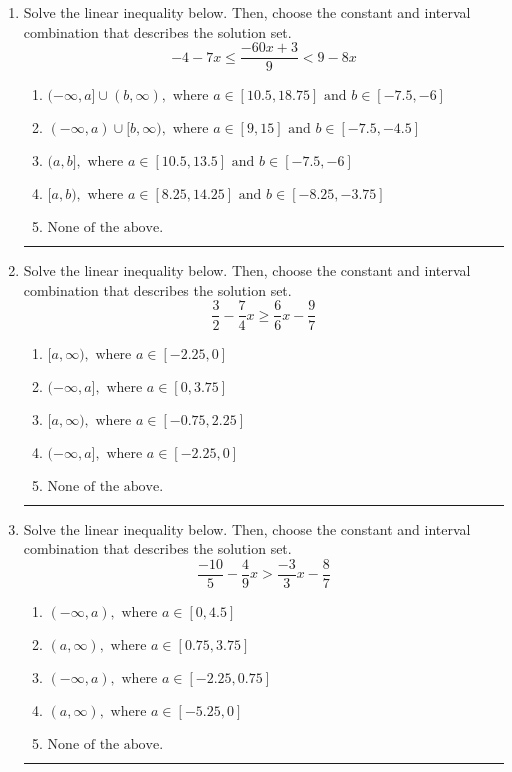 \documentclass[14pt]{extbook}
\newcommand{\litem}[1]{\item#1\hspace*{-1cm}\rule{\textwidth}{0.4pt}}
\begin{document}
\begin{enumerate}
\litem{
Solve the linear inequality below. Then, choose the constant and interval combination that describes the solution set.\[ -4 - 7 x \leq \frac{-60 x + 3}{9} < 9 - 8 x \]\begin{enumerate}[label=\Alph*.]
\item \( (-\infty, a] \cup (b, \infty), \text{ where } a \in [10.5, 18.75] \text{ and } b \in [-7.5, -6] \)
\item \( (-\infty, a) \cup [b, \infty), \text{ where } a \in [9, 15] \text{ and } b \in [-7.5, -4.5] \)
\item \( (a, b], \text{ where } a \in [10.5, 13.5] \text{ and } b \in [-7.5, -6] \)
\item \( [a, b), \text{ where } a \in [8.25, 14.25] \text{ and } b \in [-8.25, -3.75] \)
\item \( \text{None of the above.} \)

\end{enumerate} }
\litem{
Solve the linear inequality below. Then, choose the constant and interval combination that describes the solution set.\[ \frac{3}{2} - \frac{7}{4} x \geq \frac{6}{6} x - \frac{9}{7} \]\begin{enumerate}[label=\Alph*.]
\item \( [a, \infty), \text{ where } a \in [-2.25, 0] \)
\item \( (-\infty, a], \text{ where } a \in [0, 3.75] \)
\item \( [a, \infty), \text{ where } a \in [-0.75, 2.25] \)
\item \( (-\infty, a], \text{ where } a \in [-2.25, 0] \)
\item \( \text{None of the above}. \)

\end{enumerate} }
\litem{
Solve the linear inequality below. Then, choose the constant and interval combination that describes the solution set.\[ \frac{-10}{5} - \frac{4}{9} x > \frac{-3}{3} x - \frac{8}{7} \]\begin{enumerate}[label=\Alph*.]
\item \( (-\infty, a), \text{ where } a \in [0, 4.5] \)
\item \( (a, \infty), \text{ where } a \in [0.75, 3.75] \)
\item \( (-\infty, a), \text{ where } a \in [-2.25, 0.75] \)
\item \( (a, \infty), \text{ where } a \in [-5.25, 0] \)
\item \( \text{None of the above}. \)


\end{enumerate}}
\end{enumerate}
\end{document}
